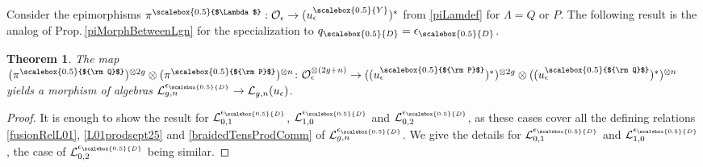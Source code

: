 \documentclass[11pt]{amsart}
\newtheorem{teo}{Theorem}[section]
\newcommand{\e}{\epsilon}
\newcommand{\Ll}{\mathcal{L}}
\newcommand{\Oo}{\mathcal{O}}
\newcommand{\qD}{q_{\scalebox{0.5}{D}}}
\newcommand{\eD}{\epsilon_{\scalebox{0.5}{D}}}
\newcommand{\Q}{{\scalebox{0.5}{${\rm Q}$}}}
\newcommand{\Y}{{\scalebox{0.5}{Y}}}
\newcommand{\Pup}{{\scalebox{0.5}{${\rm P}$}}}
\newcommand{\Lam}{{\scalebox{0.5}{$\Lambda$}}}
\begin{document}
Consider the epimorphisms $\pi^\Lam: {\mathcal O}_\epsilon \rightarrow (u_\epsilon^\Y)^{*}$ from \eqref{piLamdef} for $\Lambda=Q$ or $P$. The following result is the analog of Prop.\,\ref{piMorphBetweenLgn} for the specialization to $\qD=\eD$.
\begin{teo}\label{LgntoLgnue} The map $(\pi^\Q)^{\otimes 2g}\otimes (\pi^\Pup)^{\otimes n}\colon \Oo_\e^{\otimes (2g+n)} \rightarrow ((u_\epsilon^\Pup)^*)^{\otimes 2g}\otimes ((u_\epsilon^\Q)^*)^{\otimes n}$ yields a morphism of algebras $\mathcal{L}_{g,n}^{\eD}\rightarrow \mathcal{L}_{g,n}(u_\epsilon)$.
\end{teo}
\begin{proof} It is enough to show the result for $\Ll_{0,1}^{\eD}$, $\Ll_{1,0}^{\eD}$ and $\Ll_{0,2}^{\eD}$, as these cases cover all the defining relations \eqref{fusionRelL01}, \eqref{L01prodsept25} and \eqref{braidedTensProdComm} of $\Ll_{g,n}^{\eD}$. We give the details for $\Ll_{0,1}^{\eD}$ and $\Ll_{1,0}^{\eD}$, the case of $\Ll_{0,2}^{\eD}$ being similar.


\end{proof}
\end{document}
